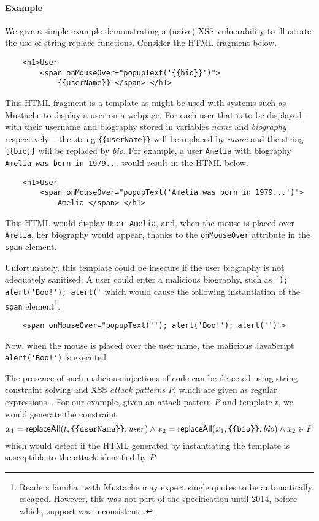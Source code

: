 
\paragraph{Example}

We give a simple example demonstrating a (naive) XSS vulnerability to illustrate the use of string-replace functions.
Consider the HTML fragment below.
\begin{verbatim}
    <h1>User 
        <span onMouseOver="popupText('{{bio}}')">
            {{userName}} </span> </h1>
\end{verbatim}
This HTML fragment is a template as might be used with systems such as Mustache to display a user on a webpage.
For each user that is to be displayed -- with their username and biography stored in variables \emph{name} and \emph{biography} respectively -- the string \verb+{{userName}}+ will be replaced by \emph{name} and the string \verb+{{bio}}+ will be replaced by \emph{bio}.
For example, a user \verb+Amelia+ with biography \verb+Amelia was born in 1979...+ would result in the HTML below.
\begin{verbatim}
    <h1>User 
        <span onMouseOver="popupText('Amelia was born in 1979...')">
            Amelia </span> </h1>
\end{verbatim}
This HTML would display \verb+User Amelia+, and, when the mouse is placed over \verb+Amelia+, her biography would appear, thanks to the \verb+onMouseOver+ attribute in the \verb+span+ element.

Unfortunately, this template could be insecure if the user biography is not adequately sanitised: 
A user could enter a malicious biography, such as \verb+'); alert('Boo!'); alert('+ which would cause the following instantiation of the \verb+span+ element\footnote{
    Readers familiar with Mustache may expect single quotes to be automatically escaped.
    However, this was not part of the specification until 2014, before which, support was inconsistent~\cite{MustacheSingleQuote}.    
}.
\begin{verbatim}
    <span onMouseOver="popupText(''); alert('Boo!'); alert('')">
\end{verbatim}
Now, when the mouse is placed over the user name, the malicious JavaScript \verb+alert('Boo!')+ is executed.

The presence of such malicious injections of code can be detected using string constraint solving and XSS \emph{attack patterns} $P$, which are given as regular expressions~\cite{BCFJKKV08,SAHMMS10,YABI14}.
For our example, given an attack pattern $P$ and template $t$, we would generate the constraint
\[
    x_1 = \replaceall(t, \verb+{{userName}}+, \mathit{user})
    \land
    x_2 = \replaceall(x_1, \verb+{{bio}}+, \mathit{bio})
    \land
    x_2 \in P
\]
which would detect if the HTML generated by instantiating the template is susceptible to the attack identified by $P$.

